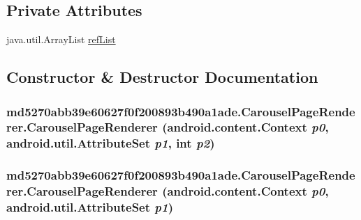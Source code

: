 \subsection*{Private Attributes}
\begin{CompactItemize}
\item 
java.util.ArrayList \hyperlink{classmd5270abb39e60627f0f200893b490a1ade_1_1_carousel_page_renderer_d48d9d828a4c63961f1670b716f7dacb}{refList}
\end{CompactItemize}


\subsection{Constructor \& Destructor Documentation}
\hypertarget{classmd5270abb39e60627f0f200893b490a1ade_1_1_carousel_page_renderer_6acde7f90db116b76b108b2bd1fb0b64}{
\subsubsection[{CarouselPageRenderer}]{\setlength{\rightskip}{0pt plus 5cm}md5270abb39e60627f0f200893b490a1ade.CarouselPageRenderer.CarouselPageRenderer (android.content.Context {\em p0}, \/  android.util.AttributeSet {\em p1}, \/  int {\em p2})}}
\label{classmd5270abb39e60627f0f200893b490a1ade_1_1_carousel_page_renderer_6acde7f90db116b76b108b2bd1fb0b64}


\hypertarget{classmd5270abb39e60627f0f200893b490a1ade_1_1_carousel_page_renderer_f27701b1f80e7c9f9a2d586417747524}{
\subsubsection[{CarouselPageRenderer}]{\setlength{\rightskip}{0pt plus 5cm}md5270abb39e60627f0f200893b490a1ade.CarouselPageRenderer.CarouselPageRenderer (android.content.Context {\em p0}, \/  android.util.AttributeSet {\em p1})}}
\label{classmd5270abb39e60627f0f200893b490a1ade_1_1_carousel_page_renderer_f27701b1f80e7c9f9a2d586417747524}


